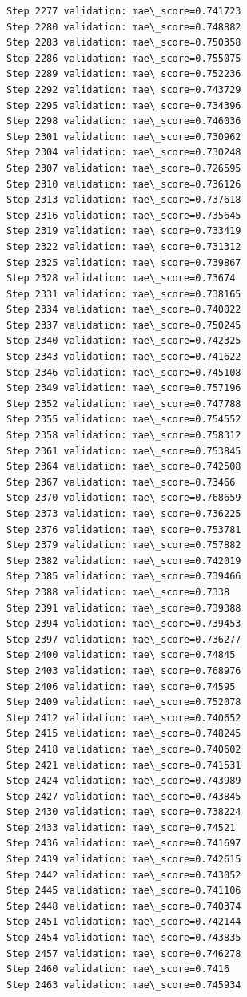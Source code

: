 \documentclass[11pt]{article}
\begin{document}
\begin{Verbatim}[commandchars=\\\{\}]
Step 2277 validation: mae\_score=0.741723
Step 2280 validation: mae\_score=0.748882
Step 2283 validation: mae\_score=0.750358
Step 2286 validation: mae\_score=0.755075
Step 2289 validation: mae\_score=0.752236
Step 2292 validation: mae\_score=0.743729
Step 2295 validation: mae\_score=0.734396
Step 2298 validation: mae\_score=0.746036
Step 2301 validation: mae\_score=0.730962
Step 2304 validation: mae\_score=0.730248
Step 2307 validation: mae\_score=0.726595
Step 2310 validation: mae\_score=0.736126
Step 2313 validation: mae\_score=0.737618
Step 2316 validation: mae\_score=0.735645
Step 2319 validation: mae\_score=0.733419
Step 2322 validation: mae\_score=0.731312
Step 2325 validation: mae\_score=0.739867
Step 2328 validation: mae\_score=0.73674
Step 2331 validation: mae\_score=0.738165
Step 2334 validation: mae\_score=0.740022
Step 2337 validation: mae\_score=0.750245
Step 2340 validation: mae\_score=0.742325
Step 2343 validation: mae\_score=0.741622
Step 2346 validation: mae\_score=0.745108
Step 2349 validation: mae\_score=0.757196
Step 2352 validation: mae\_score=0.747788
Step 2355 validation: mae\_score=0.754552
Step 2358 validation: mae\_score=0.758312
Step 2361 validation: mae\_score=0.753845
Step 2364 validation: mae\_score=0.742508
Step 2367 validation: mae\_score=0.73466
Step 2370 validation: mae\_score=0.768659
Step 2373 validation: mae\_score=0.736225
Step 2376 validation: mae\_score=0.753781
Step 2379 validation: mae\_score=0.757882
Step 2382 validation: mae\_score=0.742019
Step 2385 validation: mae\_score=0.739466
Step 2388 validation: mae\_score=0.7338
Step 2391 validation: mae\_score=0.739388
Step 2394 validation: mae\_score=0.739453
Step 2397 validation: mae\_score=0.736277
Step 2400 validation: mae\_score=0.74845
Step 2403 validation: mae\_score=0.768976
Step 2406 validation: mae\_score=0.74595
Step 2409 validation: mae\_score=0.752078
Step 2412 validation: mae\_score=0.740652
Step 2415 validation: mae\_score=0.748245
Step 2418 validation: mae\_score=0.740602
Step 2421 validation: mae\_score=0.741531
Step 2424 validation: mae\_score=0.743989
Step 2427 validation: mae\_score=0.743845
Step 2430 validation: mae\_score=0.738224
Step 2433 validation: mae\_score=0.74521
Step 2436 validation: mae\_score=0.741697
Step 2439 validation: mae\_score=0.742615
Step 2442 validation: mae\_score=0.743052
Step 2445 validation: mae\_score=0.741106
Step 2448 validation: mae\_score=0.740374
Step 2451 validation: mae\_score=0.742144
Step 2454 validation: mae\_score=0.743835
Step 2457 validation: mae\_score=0.746278
Step 2460 validation: mae\_score=0.7416
Step 2463 validation: mae\_score=0.745934

\end{Verbatim}
\end{document}
